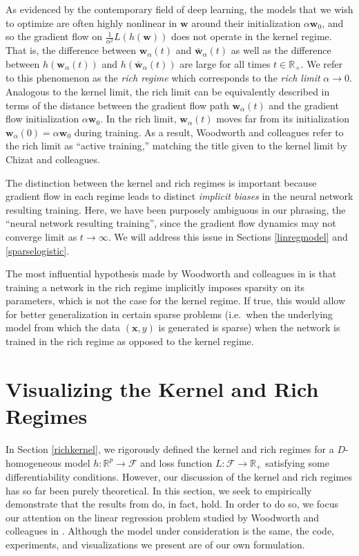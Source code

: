 \documentclass{article}
\begin{document}
As evidenced by the contemporary field of deep learning, the models that we wish to optimize are often highly nonlinear in $\boldsymbol{w}$ around their initialization $\alpha\boldsymbol{w}_0$, and so the gradient flow on $\frac{1}{\alpha^2}L(h(\boldsymbol{w}))$ does not operate in the kernel regime. That is, the difference between $\boldsymbol{w}_{\alpha}(t)$ and $\boldsymbol{\bar{w}}_{\alpha}(t)$ as well as the difference between $h(\boldsymbol{w}_{\alpha}(t))$ and $h(\boldsymbol{\bar{w}}_{\alpha}(t))$ are large for all times $t \in \mathbb{R}_+$. We refer to this phenomenon as the \textit{rich regime} which corresponds to the \textit{rich limit} $\alpha \rightarrow 0$. Analogous to the kernel limit, the rich limit can be equivalently described in terms of the distance between the gradient flow path $\boldsymbol{w}_{\alpha}(t)$ and the gradient flow initialization $\alpha\boldsymbol{w}_0$. In the rich limit, $\boldsymbol{w}_{\alpha}(t)$ moves far from its initialization $\boldsymbol{w}_{\alpha}(0) = \alpha \boldsymbol{w}_0$ during training. As a result, Woodworth and colleagues refer to the rich limit as \enquote{active training,} matching the title given to the kernel limit by Chizat and colleagues.

The distinction between the kernel and rich regimes is important because gradient flow in each regime leads to distinct \textit{implicit biases} in the neural network resulting training. Here, we have been purposely ambiguous in our phrasing, the \enquote{neural network resulting training}, since the gradient flow dynamics may not converge limit as $t \rightarrow \infty$. We will address this issue in Sections \ref{linregmodel} and \ref{sparselogistic}.

The most influential hypothesis made by Woodworth and colleagues in \cite{woodworth2020kernel} is that training a network in the rich regime implicitly imposes sparsity on its parameters, which is not the case for the kernel regime. If true, this would allow for better generalization in certain sparse problems (i.e.~when the underlying model from which the data $(\boldsymbol{x}, y)$ is generated is sparse) when the network is trained in the rich regime as opposed to the kernel regime.

\section{Visualizing the Kernel and Rich Regimes}\label{summarizekernel}

In Section \ref{richkernel}, we rigorously defined the kernel and rich regimes for a $D$-homogeneous model $h: \mathbb{R}^p \rightarrow \mathcal{F}$ and loss function $L: \mathcal{F} \rightarrow \mathbb{R}_+$ satisfying some differentiability conditions. However, our discussion of the kernel and rich regimes has so far been purely theoretical. In this section, we seek to empirically demonstrate that the results from \cite{chizat2018lazy} do, in fact, hold. In order to do so, we focus our attention on the linear regression problem studied by Woodworth and colleagues in \cite{woodworth2020kernel}. Although the model under consideration is the same, the code, experiments, and visualizations we present are of our own formulation.
\end{document}
